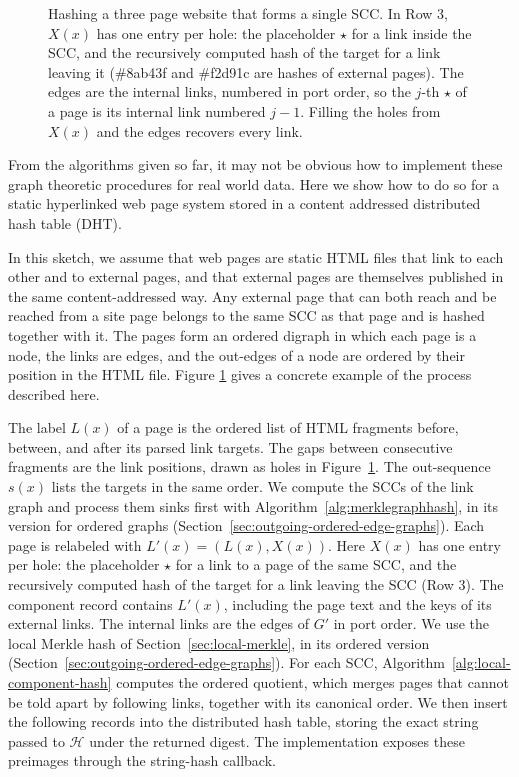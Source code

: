 \documentclass[twoside,leqno]{article}
\begin{document}
\begin{figure}
\begin{tikzpicture}[
    > = stealth, %
    node distance=4cm,
    every node/.style={draw, align=left, font=\tiny},
    semithick %
]
\end{tikzpicture}

\caption{Hashing a three page website that forms a single SCC. In Row 3, $X(x)$ has one entry per hole: the placeholder $\star$ for a link inside the SCC, and the recursively computed hash of the target for a link leaving it (\#8ab43f and \#f2d91c are hashes of external pages). The edges are the internal links, numbered in port order, so the $j$-th $\star$ of a page is its internal link numbered $j-1$. Filling the holes from $X(x)$ and the edges recovers every link.}
\label{fig:webpage-example}
\end{figure}

From the algorithms given so far, it may not be obvious how to implement these graph theoretic procedures for real world data. Here we show how to do so for a static hyperlinked web page system stored in a content addressed distributed hash table (DHT).

In this sketch, we assume that web pages are static HTML files that link to each other and to external pages, and that external pages are themselves published in the same content-addressed way. Any external page that can both reach and be reached from a site page belongs to the same SCC as that page and is hashed together with it. The pages form an ordered digraph in which each page is a node, the links are edges, and the out-edges of a node are ordered by their position in the HTML file. Figure \ref{fig:webpage-example} gives a concrete example of the process described here.

The label $L(x)$ of a page is the ordered list of HTML fragments before, between, and after its parsed link targets. The gaps between consecutive fragments are the link positions, drawn as holes in Figure~\ref{fig:webpage-example}. The out-sequence $s(x)$ lists the targets in the same order. We compute the SCCs of the link graph and process them sinks first with Algorithm~\ref{alg:merklegraphhash}, in its version for ordered graphs (Section~\ref{sec:outgoing-ordered-edge-graphs}). Each page is relabeled with $L'(x)=(L(x),X(x))$. Here $X(x)$ has one entry per hole: the placeholder $\star$ for a link to a page of the same SCC, and the recursively computed hash of the target for a link leaving the SCC (Row 3). The component record contains $L'(x)$, including the page text and the keys of its external links. The internal links are the edges of $G'$ in port order. We use the local Merkle hash of Section~\ref{sec:local-merkle}, in its ordered version (Section~\ref{sec:outgoing-ordered-edge-graphs}). For each SCC, Algorithm~\ref{alg:local-component-hash} computes the ordered quotient, which merges pages that cannot be told apart by following links, together with its canonical order. We then insert the following records into the distributed hash table, storing the exact string passed to $\mathcal{H}$ under the returned digest. The implementation exposes these preimages through the string-hash callback.
\end{document}
